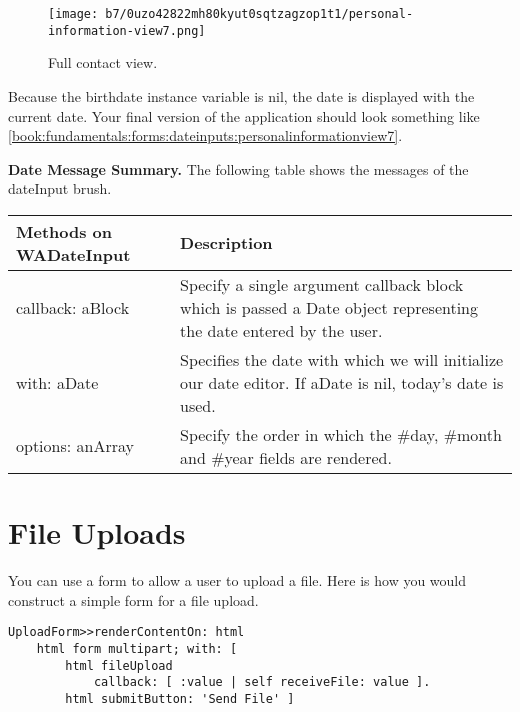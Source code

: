 \documentclass[a4paper,10pt,twoside]{book}
\newcommand{\ct}[1]{{\small\ttfamily\textup{#1}}}
\begin{document}
\begin{figure}[h!tbp]
	\begin{center}
		\texttt{[image: b7/0uzo42822mh80kyut0sqtzagzop1t1/personal-information-view7.png]}
		\caption{Full contact view.\label{book:fundamentals:forms:dateinputs:personalinformationview7}}
	\end{center}
\end{figure}

   

Because the \ct{birthdate} instance variable is \ct{nil}, the date is displayed with the current date. Your final version of the application should look something like \autoref{book:fundamentals:forms:dateinputs:personalinformationview7}.

\textbf{Date Message Summary.} The following table shows the messages of the \ct{dateInput} brush.


\begin{tabularx}{\textwidth}{lX}
\textbf{Methods on \ct{WADateInput} }&\textbf{Description}\\ \hline
 \index{WADateInput!callback: aBlock} \ct{callback: aBlock}& Specify a single argument callback block which is passed a \ct{Date} object representing the date entered by the user. \\
 \index{WADateInput!with: aDate} \ct{with: aDate}&Specifies the date with which we will initialize our date editor. If \ct{aDate} is \ct{nil}, today's date is used.\\
 \index{WADateInput!options: anArray} \ct{options: anArray}& Specify the order in which the \ct{\#day}, \ct{\#month} and \ct{\#year} fields are rendered.\\
\end{tabularx}

\section{File Uploads}
\label{book:fundamentals:forms:fileupload}


You can use a form to allow a user to upload a file. Here is how you
would construct a simple form for a file upload.

\begin{lstlisting}
UploadForm>>renderContentOn: html
    html form multipart; with: [
        html fileUpload
            callback: [ :value | self receiveFile: value ].
        html submitButton: 'Send File' ]
\end{lstlisting}
\end{document}
